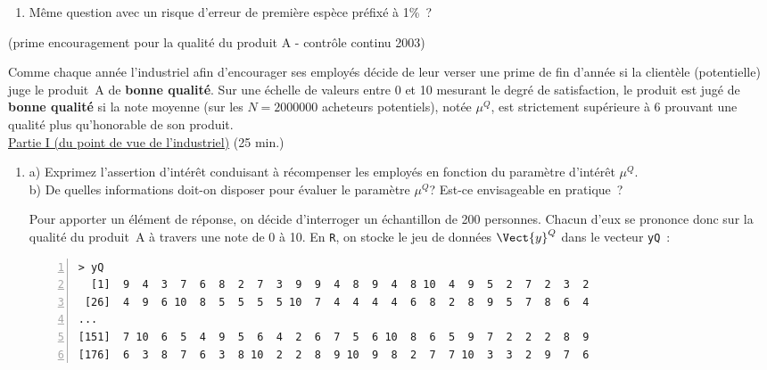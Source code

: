 \documentclass[10pt]{report}
\begin{document}
\begin{exercice}
\begin{enumerate}
\item M{\^e}me question avec un risque d'erreur de premi{\`e}re esp{\`e}ce pr{\'e}fix{\'e} {\`a} 1\%~?




\end{enumerate}
\end{exercice}

\begin{exercice} (prime encouragement pour la qualité du produit A - contrôle continu 2003)

Comme chaque ann{\'e}e l'industriel afin d'encourager ses employ{\'e}s d{\'e}cide de leur verser une prime de fin d'ann{\'e}e si la client{\`e}le (potentielle) juge le produit~A de \textbf{bonne qualit{\'e}}. Sur une {\'e}chelle de valeurs  entre 0 et 10 mesurant le degr{\'e} de satisfaction, le produit est jug{\'e} de \textbf{bonne qualit{\'e}} si la note moyenne (sur les $N=2000000$ acheteurs potentiels), not{\'e}e $\mu^Q$, est strictement sup{\'e}rieure {\`a} 6 prouvant une qualit{\'e} plus qu'honorable de son produit.\\
\noindent \underline{Partie I (du point de vue de l'industriel)} (25 min.) \\

\begin{enumerate}
\item a) Exprimez l'assertion d'int{\'e}r{\^e}t conduisant {\`a} r{\'e}compenser les employ{\'e}s en fonction du param{\`e}tre d'int{\'e}r{\^e}t $\mu^Q$. \\



b) De quelles informations doit-on disposer pour {\'e}valuer le param{\`e}tre $\mu^Q$? Est-ce envisageable en pratique~?




Pour apporter un {\'e}l{\'e}ment de r{\'e}ponse, on d{\'e}cide d'interroger un {\'e}chantillon de 200 personnes. Chacun d'eux se prononce donc sur la qualit{\'e} du produit~A {\`a} travers une note de 0 {\`a} 10. En \texttt{R}, on stocke le jeu de donn{\'e}es $\Vect{y}^Q$ dans le vecteur \texttt{yQ}~:

\begin{Verbatim}[frame=leftline,fontfamily=tt,fontshape=n,numbers=left]
> yQ
  [1]  9  4  3  7  6  8  2  7  3  9  9  4  8  9  4  8 10  4  9  5  2  7  2  3  2
 [26]  4  9  6 10  8  5  5  5  5 10  7  4  4  4  4  6  8  2  8  9  5  7  8  6  4
...
[151]  7 10  6  5  4  9  5  6  4  2  6  7  5  6 10  8  6  5  9  7  2  2  2  8  9
[176]  6  3  8  7  6  3  8 10  2  2  8  9 10  9  8  2  7  7 10  3  3  2  9  7  6
\end{Verbatim}


\end{enumerate}
\end{exercice}
\end{document}
